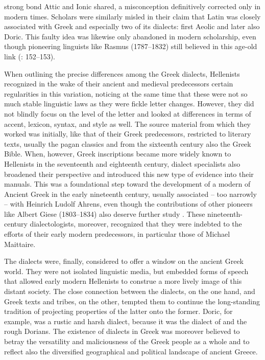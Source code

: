 strong bond Attic and Ionic shared, a misconception definitively corrected only in modern times. Scholars were similarly misled in their claim that Latin was closely associated with Greek and especially two of its dialects: first Aeolic and later also Doric. This faulty idea was likewise only abandoned in modern scholarship, even though pioneering linguists like Rasmus \citeauthor{Rask2013} (1787–1832) still believed in this age-old link (\citeyear{Rask2013}: 152–153).

When outlining the precise differences among the Greek dialects, Hellenists recognized in the wake of their ancient and medieval predecessors certain regularities in this variation, noticing at the same time that these were not so much stable linguistic laws as they were fickle letter changes. However, they did not blindly focus on the level of the letter and looked at differences in terms of accent, lexicon, syntax, and style as well. The source material from which they worked was initially, like that of their Greek predecessors, restricted to literary texts, usually the pagan classics and from the sixteenth century also the Greek Bible. When, however, Greek inscriptions became more widely known to Hellenists in the seventeenth and eighteenth century, dialect specialists also broadened their perspective and introduced this new type of evidence into their manuals. This was a foundational step toward the development of a modern  of Ancient Greek in the early nineteenth century, usually associated – too narrowly – with Heinrich Ludolf Ahrens, even though the contributions of other pioneers like Albert Giese (1803–1834) also deserve further study \citep{Giese1837}. These nineteenth-century dialectologists, moreover, recognized that they were indebted to the efforts of their early modern predecessors, in particular those of Michael Maittaire.

The dialects were, finally, considered to offer a window on the ancient Greek world. They were not isolated linguistic media, but embedded forms of speech that allowed early modern Hellenists to construe a more lively image of this distant society. The close connection between the dialects, on the one hand, and Greek texts and tribes, on the other, tempted them to continue the long-standing tradition of projecting properties of the latter onto the former. Doric, for example, was a rustic and harsh dialect, because it was the dialect of  and the rough Dorians. The existence of dialects in Greek was moreover believed to betray the versatility and maliciousness of the Greek people as a whole and to reflect also the diversified geographical and political landscape of ancient Greece.

